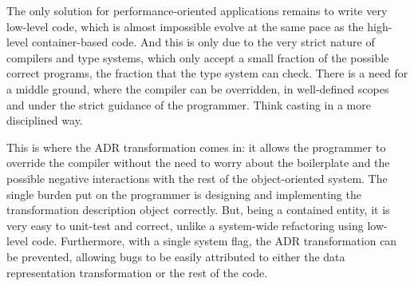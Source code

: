 The only solution for performance-oriented applications remains to write very low-level code, which is almost impossible evolve at the same pace as the high-level container-based code. And this is only due to the very strict nature of compilers and type systems, which only accept a small fraction of the possible correct programs, the fraction that the type system can check. There is a need for a middle ground, where the compiler can be overridden, in well-defined scopes and under the strict guidance of the programmer. Think casting in a more disciplined way.

This is where the ADR transformation comes in: it allows the programmer to override the compiler without the need to worry about the boilerplate and the possible negative interactions with the rest of the object-oriented system. The single burden put on the programmer is designing and implementing the transformation description object correctly. But, being a contained entity, it is very easy to unit-test and correct, unlike a system-wide refactoring using low-level code. Furthermore, with a single system flag, the ADR transformation can be prevented, allowing bugs to be easily attributed to either the data representation transformation or the rest of the code.
